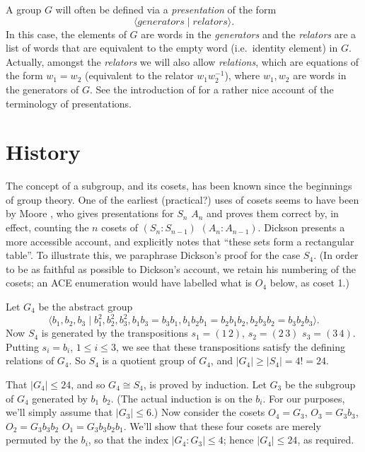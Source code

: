A group $G$ will often be defined via a \emph{presentation} of the form
  $$\langle \textit{generators} \mid \textit{relators} \rangle.$$
In this case, the elements of $G$ are words in the \emph{generators}
  and the \emph{relators} are a list of words that are equivalent to 
  the empty word (i.e.~identity element) in $G$. 
Actually, amongst the \emph{relators} we will also allow \emph{relations},
  which are equations of the form $w_1 = w_2$ (equivalent to the relator 
  $w_1w_2^{-1}$), where $w_1, w_2$ are words in the generators of $G$.
See the introduction of \cite{MKS76} for a rather nice account of the
  terminology of presentations.

\section{History}

The concept of a subgroup, and its cosets, has been known since the 
  beginnings of group theory.
One of the earliest (practical?) uses of cosets seems to have been by
  Moore \cite{Moo97}, who gives presentations for $S_n$ \amp $A_n$ and
  proves them correct by, in effect, counting the $n$ cosets of 
  $(S_n:S_{n-1})$ \amp $(A_n:A_{n-1})$.
Dickson \cite[\S264]{Dic01} presents a more accessible account, and 
  explicitly notes that ``these sets form a rectangular table''\kern-2pt.
%
To illustrate this, we paraphrase Dickson's proof for the case $S_4$.
(In order to be as faithful as possible to Dickson's account, we retain
his numbering of the cosets; an ACE enumeration would have labelled what
is $O_4$ below, as coset 1.)

Let $G_4$ be the abstract group
  $$ \langle b_1,b_2,b_3 \mid b_1^2,b_2^2,b_3^2,
       b_1b_3=b_3b_1, b_1b_2b_1=b_2b_1b_2,b_2b_3b_2=b_3b_2b_3 \rangle . $$
Now $S_4$ is generated by the transpositions $s_1=(1\,2)$, $s_2=(2\,3)$ \amp 
  $s_3=(3\,4)$.
Putting $s_i=b_i$, $1 \le i \le 3$, we see that these transpositions 
  satisfy the defining relations of $G_4$.
So $S_4$ is a quotient group of $G_4$, and $|G_4| \ge |S_4| = 4! = 24$.

That $|G_4| \le 24$, and so $G_4 \cong S_4$, is proved by induction.
Let $G_3$ be the subgroup of $G_4$ generated by $b_1$ \amp $b_2$.
(The actual induction is on the $b_i$.
For our purposes, we'll simply assume that $|G_3| \le 6$.)
Now consider the cosets $O_4=G_3$, $O_3=G_3b_3$, $O_2=G_3b_3b_2$ \amp 
  $O_1=G_3b_3b_2b_1$.
We'll show that these four cosets are merely permuted by the $b_i$, so
  that the index $|G_4 : G_3| \le 4$; hence $|G_4| \le 24$, as required.

